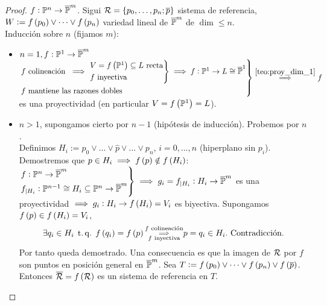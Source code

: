 \begin{proof}
	$f : \mathbb{P}^n \to \overline{\mathbb{P}}^m$. Sigui $\mathcal{R} = \{ p_0, \dots, p_n; \overline{p} \}$ sistema de referencia, $W := f \left( p_0 \right) \vee \dots \vee f \left( p_n \right)$ variedad lineal de $\overline{\mathbb{P}}^m$ de $\dim \leq n$. \\
	Inducción sobre $n$ (fijamos $m$):
	\begin{itemize}
		\item $n = 1, f : \mathbb{P}^1 \to \overline{\mathbb{P}}^m$ \\
		$\begin{rcases}
			f \text{ colineación } \implies 
			\begin{rcases}
				V = f \left( \mathbb{P}^1 \right) \subseteq L \text{ recta} \\
				f \text{ inyectiva}
			\end{rcases}
			\implies f : \mathbb{P}^1 \to L \cong \overline{\mathbb{P}}^1 \\
			f \text{ mantiene las razones dobles}
		\end{rcases}
		\stackrel{\ref{teo:proy_dim_1}}{\implies} f$ es una proyectividad (en particular $V = f \left( \mathbb{P}^1 \right) = L$).
		\item $n > 1$, supongamos cierto por $n-1$ (hipótesis de inducción). Probemos por $n$. \\
		Definimos $H_i := p_0 \vee \dots \vee \hat{p} \vee \dots \vee p_n$, $i = 0, \dots, n$ (hiperplano sin $p_i$). Demostremos que $p \in H_i \implies f \left( p \right) \notin f \left( H_i \right)$: \\
		$\begin{rcases}
			f : \mathbb{P}^n \to \overline{\mathbb{P}}^m \\
			f_{|H_i} : \mathbb{P}^{n-1} \cong H_i \subseteq \mathbb{P}^n \to \overline{\mathbb{P}}^m
		\end{rcases}
		\implies g_i = f_{|H_i} : H_i \to \overline{\mathbb{P}}^m$ es una proyectividad $\implies g_i : H_i \to f \left( H_i \right) = V_i$ es biyectiva. Supongamos $f \left( p \right) \in f \left( H_i \right) = V_i$,
		\[
			\exists q_i \in H_i \operatorname{\;t.q.\;} f \left( q_i \right) = f \left( p \right) \substack{f \text{ colineación} \\ \implies \\ f \text{ inyectiva}} p = q_i \in H_i. \text{ Contradicción.}
		\]
		Por tanto queda demostrado. Una consecuencia es que la imagen de $\mathcal{R}$ por $f$ son puntos en posición general en $\overline{\mathbb{P}}^m$. Sea $T := f \left( p_0 \right) \vee \dots \vee f \left( p_n \right) \vee f \left( \overline{p} \right)$. Entonces $\overline{\mathcal{R}} = f \left( \mathcal{R} \right)$ es un sistema de referencia en $T$.
		

\end{itemize}
\end{proof}
